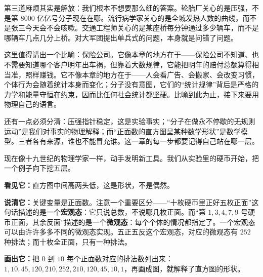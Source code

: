 第三道麻烦其实是解放：我们根本不想要那么细的答案。轮胎厂关心的是压强，不是第 \(8000\) 亿亿号分子现在在哪。流行病学家关心的是全城发热人数的曲线，而不是张三今天会不会咳嗽。交通工程师关心的是某座桥每分钟通过多少辆车，而不是哪辆车几点几分上桥。对大军团提出单兵式的问题，本身就是问错了问题。

这里值得请出一个比喻：保险公司。它像本章的地方在于——保险公司不知道、也不需要知道哪个客户明年出车祸，但靠着大数规律，它能把明年的赔付总额算得相当准，照样赚钱。它不像本章的地方在于——人会看广告、会搬家、会改变习惯，个体行为会随着统计本身而变化；分子没有意图，它们的“统计规律”背后是严格的力学和能量守恒在约束，因而比任何社会统计都坚硬。比喻到此为止，接下来要用物理自己的语言。

还有一点必须分清：压强指针稳定，这是实验事实；“分子在做永不停歇的无规则运动”是我们对事实的物理解释；而“正面数的直方图呈某种数学形状”是数学模型。三者各有来源，谁也不能冒充谁。这一章的每一步都要记得自己站在哪一层。


现在像十九世纪的物理学家一样，动手发明新工具。我们从实验里的硬币开始，把一个例子向下挖五层。

\textbf{看见它：}直方图中间高两头低，这是形状，不是偶然。

\textbf{说清它：}关键变量是正面数。注意一个重要区分——“十枚硬币里正好五枚正面”这句话描述的是一个\textbf{宏观态}：它只说总数，不说哪几枚正面。而“第 \(1,3,4,7,9\) 号硬币正面，其余反面”描述的是一个\textbf{微观态}：每个个体的情况都指定了。一个宏观态可以由许许多多不同的微观态实现。五正五反这个宏观态，对应的微观态有 \(252\) 种排法；而十枚全正面，只有一种排法。

\textbf{画出它：}把 \(0\) 到 \(10\) 每个正面数对应的排法数列出来：\(1,10,45,120,210,252,210,120,45,10,1\)，再画成图，就解释了直方图的形状。

\begin{center}
\end{center}

